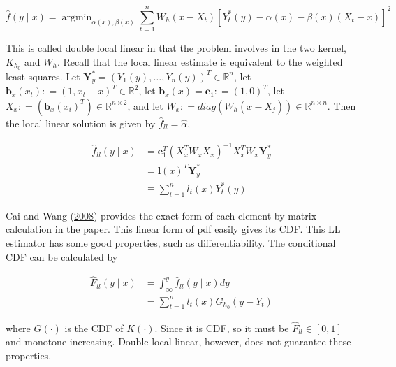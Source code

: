 \documentclass[
]{article}
\theoremstyle{definition}
\theoremstyle{definition}
\theoremstyle{definition}
\theoremstyle{remark}
\begin{document}
\begin{equation}
  \hat{f}(y \mid x) = \mathop{\mathrm{argmin}}_{\alpha(x), \beta(x)} \sum_{t = 1}^n W_h (x - X_t) \left[ Y_t^{\ast}(y) - \alpha(x) - \beta(x) (X_t - x) \right]^2
  \label{eq:doublell}
\end{equation}

This is called double local linear in that the problem involves in the two kernel, \(K_{h_0}\) and \(W_h\). Recall that the local linear estimate is equivalent to the weighted least squares. Let \(\mathbf{Y}_y^{\ast} = \left( Y_1(y), \ldots, Y_n(y) \right)^T \in \mathbb{R}^n\), let \(\mathbf{b}_x(x_t) \mathpunct{:}=(1, x_t - x)^T \in \mathbb{R}^2\), let \(\mathbf{b}_x(x) = \mathbf{e}_1 \mathpunct{:}=(1, 0)^T\), let \(X_x \mathpunct{:}=\left( \mathbf{b}_x(x_i)^T \right) \in \mathbb{R}^{n \times 2}\), and let \(W_x \mathpunct{:}=diag(W_h(x - X_j)) \in \mathbb{R}^{n \times n}\). Then the local linear solution is given by \(\hat{f}_{ll} = \hat\alpha\),

\begin{equation}
  \begin{split}
    \hat{f}_{ll}(y \mid x) & = \mathbf{e}_1^T (X_x^T W_x X_x)^{-1} X_x^T W_x \mathbf{Y}_y^{\ast} \\
    & = \mathbf{l}(x)^T \mathbf{Y}_y^{\ast} \\
    & \equiv \sum_{t = 1}^n l_t(x) Y_t^{\ast}(y)
  \end{split}
  \label{eq:llsolution}
\end{equation}

Cai and Wang (\protect\hyperlink{ref-cai:2008aa}{2008}) provides the exact form of each element by matrix calculation in the paper. This linear form of pdf easily gives its CDF. This LL estimator has some good properties, such as differentiability. The conditional CDF can be calculated by

\begin{equation}
  \begin{split}
    \hat{F}_{ll}(y \mid x) & = \int_\infty^y \hat{f}_{ll}(y \mid x) dy \\
    & = \sum_{t = 1}^n l_t(x) G_{h_0}(y - Y_t)
  \end{split}
  \label{eq:llcdf}
\end{equation}

where \(G(\cdot)\) is the CDF of \(K(\cdot)\). Since it is CDF, so it must be \(\hat{F}_{ll} \in [0, 1]\) and monotone increasing. Double local linear, however, does not guarantee these properties.
\end{document}
